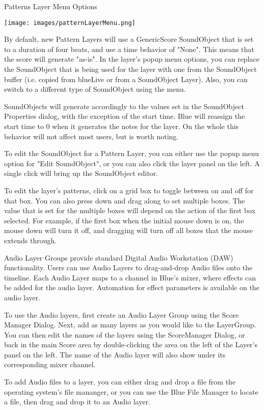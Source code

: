 Patterns Layer Menu Options

\texttt{[image: images/patternLayerMenu.png]}

By default, new Pattern Layers will use a GenericScore SoundObject that
is set to a duration of four beats, and use a time behavior of "None".
This means that the score will generate "as-is". In the layer's popup
menu options, you can replace the SoundObject that is being used for the
layer with one from the SoundObject buffer (i.e. copied from blueLive or
from a SoundObject Layer). Also, you can switch to a different type of
SoundObject using the menu.

SoundObjects will generate accordingly to the values set in the
SoundObject Properties dialog, with the exception of the start time.
Blue will reassign the start time to 0 when it generates the notes for
the layer. On the whole this behavior will not affect most users, but is
worth noting.

To edit the SoundObject for a Pattern Layer, you can either use the
popup menu option for "Edit SoundObject", or you can also click the
layer panel on the left. A single click will bring up the SoundObject
editor.

To edit the layer's patterns, click on a grid box to toggle between on
and off for that box. You can also press down and drag along to set
multiple boxes. The value that is set for the multiple boxes will depend
on the action of the first box selected. For example, if the first box
when the initial mouse down is on, the mouse down will turn it off, and
dragging will turn off all boxes that the mouse extends through.

Audio Layer Groups provide standard Digital Audio Workstation (DAW)
functionality. Users can use Audio Layers to drag-and-drop Audio files
onto the timeline. Each Audio Layer maps to a channel in Blue's mixer,
where effects can be added for the audio layer. Automation for effect
parameters is available on the audio layer.

To use the Audio layers, first create an Audio Layer Group using the
Score Manager Dialog. Next, add as many layers as you would like to the
LayerGroup. You can then edit the names of the layers using the
ScoreManager Dialog, or back in the main Score area by double-clicking
the area on the left of the Layer's panel on the left. The name of the
Audio layer will also show under its corresponding mixer channel.

To add Audio files to a layer, you can either drag and drop a file from
the operating system's file mananger, or you can use the Blue File
Manager to locate a file, then drag and drop it to an Audio layer.

